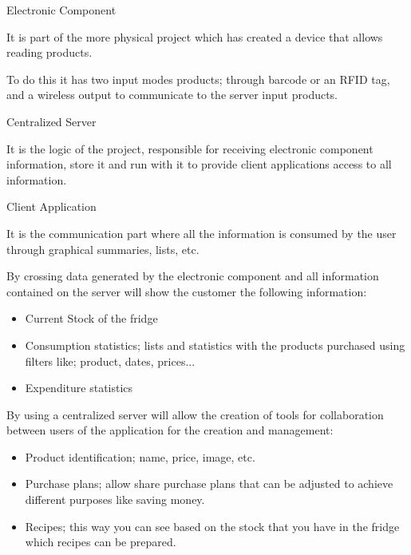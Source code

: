 \begin{description}
    \item Electronic Component

        It is part of the more physical project which has created a device that allows reading products.

        To do this it has two input modes products; through barcode or an RFID tag, and a wireless output to communicate to the server input products.

    \item Centralized Server

        It is the logic of the project, responsible for receiving electronic component information, store it and run with it to provide client applications access to all information.

    \item Client Application

            It is the communication part where all the information is consumed by the user through graphical summaries, lists, etc.

            By crossing data generated by the electronic component and all information contained on the server will show the customer the following information:
            \begin{itemize}
                \item Current Stock of the fridge
                \item Consumption statistics; lists and statistics with the products purchased using filters like; product, dates, prices...
                \item Expenditure statistics
            \end{itemize}

            By using a centralized server will allow the creation of tools for collaboration between users of the application for the creation and management:

            \begin{itemize}
                \item Product identification; name, price, image, etc.
                \item Purchase plans; allow share purchase plans that can be adjusted to achieve different purposes like saving money.
                \item Recipes; this way you can see based on the stock that you have in the fridge which recipes can be prepared.
            \end{itemize}
\end{description}